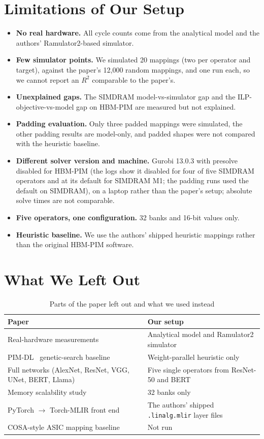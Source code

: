 \documentclass[conference]{IEEEtran}
\begin{document}
\section{Limitations of Our Setup}
\label{sec:limits}
\begin{itemize}
\item \textbf{No real hardware.} All cycle counts come from the analytical
model and the authors' Ramulator2-based simulator.
\item \textbf{Few simulator points.} We simulated 20 mappings (two per operator
and target), against the paper's 12{,}000 random mappings, and one run each, so
we cannot report an $R^2$ comparable to the paper's.
\item \textbf{Unexplained gaps.} The SIMDRAM model-vs-simulator gap and the
ILP-objective-vs-model gap on HBM-PIM are measured but not explained.
\item \textbf{Padding evaluation.} Only three padded mappings were simulated, the other padding results are model-only, and padded shapes were not compared with the heuristic baseline.
\item \textbf{Different solver version and machine.} Gurobi 13.0.3 with
presolve disabled for HBM-PIM (the logs show it disabled for four of five SIMDRAM operators and at its default for SIMDRAM M1; the padding runs used the default on SIMDRAM), on a laptop rather than the paper's setup; absolute solve
times are not comparable.
\item \textbf{Five operators, one configuration.} 32 banks and 16-bit values
only.
\item \textbf{Heuristic baseline.} We use the authors' shipped heuristic
mappings rather than the original HBM-PIM software.
\end{itemize}

\section{What We Left Out}
\begin{table}[h]
\centering
\caption{Parts of the paper left out and what we used instead}
\label{tab:leftout}
\footnotesize
\begin{tabular}{p{}p{}}
\toprule
Paper & Our setup \\
\midrule
Real-hardware measurements & Analytical model and Ramulator2 simulator \\
PIM-DL~\cite{pimdl} genetic-search baseline & Weight-parallel heuristic only \\
Full networks (AlexNet, ResNet, VGG, UNet, BERT, Llama) & Five single operators from ResNet-50 and BERT \\
Memory scalability study & 32 banks only \\
PyTorch $\to$ Torch-MLIR front end & The authors' shipped \texttt{.linalg.mlir} layer files \\
COSA-style ASIC mapping baseline & Not run \\
\bottomrule
\end{tabular}
\end{table}
\end{document}
